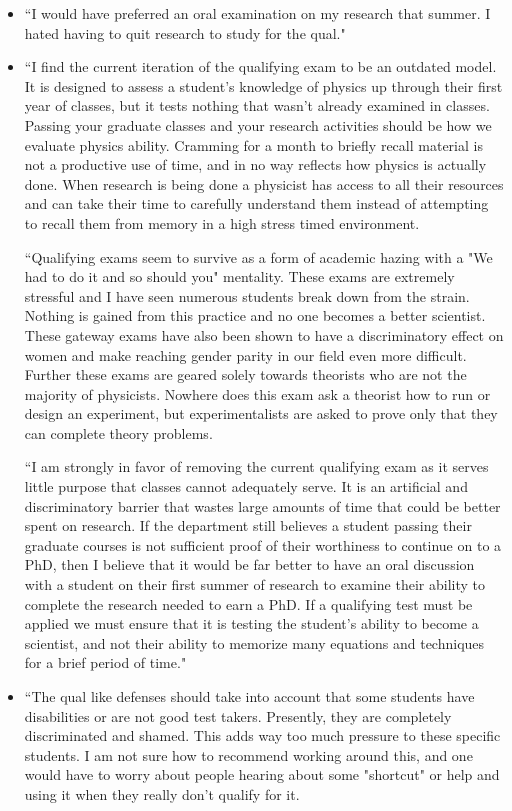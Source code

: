 \documentclass[oneside]{book}   %
\begin{document}
\begin{itemize}
	\item ``I would have preferred an oral examination on my research that summer. I hated having to quit research to study for the qual."
	\item ``I find the current iteration of the qualifying exam to be an outdated model. It is designed to assess a student's knowledge of physics up through their first year of classes, but it tests nothing that wasn't already examined in classes. Passing your graduate classes and your research activities should be how we evaluate physics ability. Cramming for a month to briefly recall material is not a productive use of time, and in no way reflects how physics is actually done. When research is being done a physicist has access to all their resources and can take their time to carefully understand them instead of attempting to recall them from memory in a high stress timed environment. 


``Qualifying exams seem to survive as a form of academic hazing with a "We had to do it and so should you" mentality. These exams are extremely stressful and I have seen numerous students break down from the strain. Nothing is gained from this practice and no one becomes a better scientist. These gateway exams have also been shown to have a discriminatory effect on women and make reaching gender parity in our field even more difficult. Further these exams are geared solely towards theorists who are not the majority of physicists. Nowhere does this exam ask a theorist how to run or design an experiment, but experimentalists are asked to prove only that they can complete theory problems. 

``I am strongly in favor of removing the current qualifying exam as it serves little purpose that classes cannot adequately serve. It is an artificial and discriminatory barrier that wastes large amounts of time that could be better spent on research. If the department still believes a student passing their graduate courses is not sufficient proof of their worthiness to continue on to a PhD, then I believe that it would be far better to have an oral discussion with a student on their first summer of research to examine their ability to complete the research needed to earn a PhD. If a qualifying test must be applied we must ensure that it is testing the student's ability to become a scientist, and not their ability to memorize many equations and techniques for a brief period of time."
	\item ``The qual like defenses should take into account that some students have disabilities or are not good test takers. Presently, they are completely discriminated and shamed. This adds way too much pressure to these specific students. I am not sure how to recommend working around this, and one would have to worry about people hearing about some "shortcut" or help and using it when they really don't qualify for it.


\end{itemize}
\end{document}
